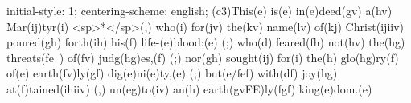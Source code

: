 initial-style: 1;
centering-scheme: english;
(c3)This(e) is(e) in(e)deed(gv) a(hv) Mar(ij)tyr(i) <sp>*</sp>(,) who(i) for(jv) the(kv) name(lv) of(kj) Christ(ijiiv) poured(gh) forth(ih) his(f) life-(e)blood:(e) (;) who(d) feared(fh) not(hv) the(hg) threats(fe~) of(fv) judg(hg)es,(f) (;) nor(gh) sought(ij) for(i) the(h) glo(hg)ry(f) of(e) earth(fv)ly(gf) dig(e)ni(e)ty,(e) (;) but(e/fef) with(df) joy(hg) at(f)tained(ihiiv) (,) un(eg)to(iv) an(h) earth(gvFE)ly(fgf) king(e)dom.(e)
